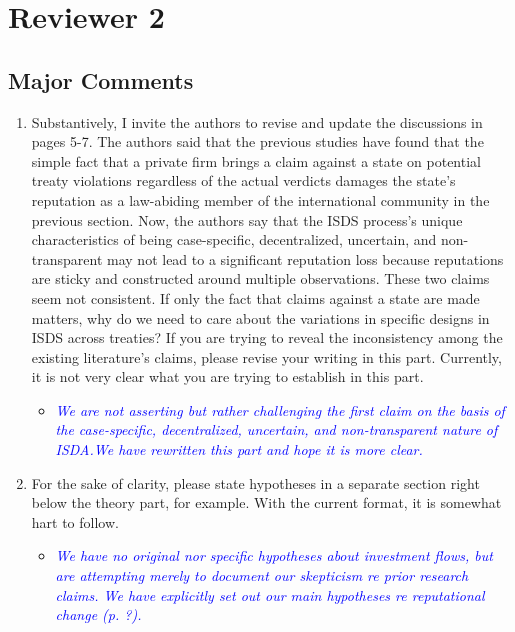 \section{Reviewer 2}

\subsection{Major Comments}

\begin{enumerate}
	\item Substantively, I invite the authors to revise and update the discussions in pages 5-7. The authors said that the previous studies have found that the simple fact that a private firm brings a claim against a state on potential treaty violations regardless of the actual verdicts damages the state’s reputation as a law-abiding member of the international community in the previous section. Now, the authors say that the ISDS process’s unique characteristics of being case-specific, decentralized, uncertain, and non-transparent may not lead to a significant reputation loss because reputations are sticky and constructed around multiple observations. These two claims seem not consistent. If only the fact that claims against a state are made matters, why do we need to care about the variations in specific designs in ISDS across treaties? If you are trying to reveal the inconsistency among the existing literature’s claims, please revise your writing in this part. Currently, it is not very clear what you are trying to establish in this part.
	\begin{itemize}
		\item \textcolor{blue}{ \emph{ 
		We are not asserting but rather challenging the first claim on the basis of the case-specific, decentralized, uncertain, and non-transparent nature of ISDA.We have rewritten this part and hope it is more clear.
		}}
	\end{itemize}
	\item For the sake of clarity, please state hypotheses in a separate section right below the theory part, for example. With the current format, it is somewhat hart to follow.	
	\begin{itemize}
		\item \textcolor{blue}{ \emph{
		We have no original nor specific hypotheses about investment flows, but are attempting merely to document our skepticism re prior research claims. We have explicitly set out our main hypotheses re reputational change (p. ?).		
}}
\end{itemize}
\end{enumerate}
